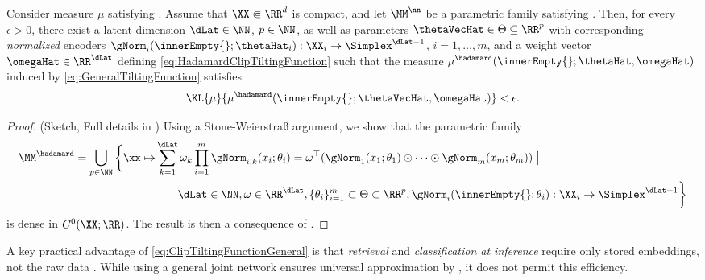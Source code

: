 \documentclass{article}
\begin{document}
\begin{theorem}
 \label{thm:UniversalApproximationHadamardClip}
 Consider measure $\mu$ satisfying .
 Assume that $\XX \Subset \RR^{d}$ is compact, and let $\MM^\nn$ be a parametric
 family satisfying
 .
 Then, for every $\epsilon > 0$, there exist a latent dimension $\dLat \in
  \NN$, $p\in \NN$, as well as parameters $\thetaVecHat \in \Theta \subseteq \RR^p$ with corresponding
 \emph{normalized} encoders $\gNorm_i(\innerEmpty{};\thetaHat_i) : \XX_i \to
  \Simplex^{\dLat - 1}$, $i=1,\ldots, m$, and a weight vector $\omegaHat \in
  \RR^{\dLat}$ defining \eqref{eq:HadamardClipTiltingFunction} such that the
 measure $\mu^{\hadamard}(\innerEmpty{};\thetaHat, \omegaHat)$ induced by
 \eqref{eq:GeneralTiltingFunction} satisfies
 \begin{align*}
  \KL{\mu}{\mu^{\hadamard}(\innerEmpty{};\thetaVecHat, \omegaHat)} < \epsilon.
 \end{align*}
\end{theorem}
\begin{proof}(Sketch, Full details in )
 Using a Stone-Weierstraß argument, we show that the parametric family
 \begin{align*}
  \MM^{\hadamard} = \bigcup_{p \in \NN} \bigg\{
  \xx \mapsto & \sum_{k=1}^{\dLat} \omega_k \prod_{i=1}^{m} \gNorm_{i,k}(x_i;\theta_i)
  = \omega^\top (\gNorm_1(x_1; \theta_1) \odot \cdots \odot \gNorm_m(x_m; \theta_m))
  \; \big\vert\;                                                                       \\
              & \qquad\dLat\in \NN, \omega \in \RR^{\dLat},
  \{\theta_i\}_{i=1}^m \subset \Theta
  \subset \RR^p,
  \gNorm_i(\innerEmpty{};\theta_i) : \XX_i \to \Simplex^{\dLat - 1}
  \bigg\}
 \end{align*}
 is dense in $C^0(\XX; \RR)$. The result is then a consequence of
 .
\end{proof}
A key practical advantage of \eqref{eq:ClipTiltingFunctionGeneral} is
that \emph{retrieval} and \emph{classification at inference}
require only stored embeddings, not the raw data
\cite[Sec.~4]{baptistaMathematicalPerspectiveContrastive2025}.
While using a general joint network ensures universal approximation
by , it does not permit
this efficiency.
\end{document}
